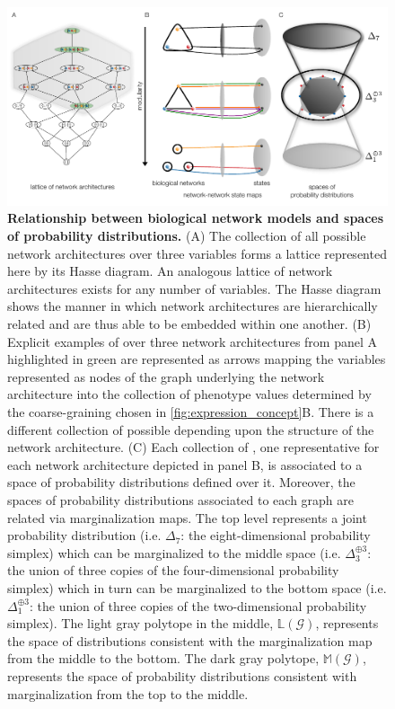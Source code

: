 


\begin{figure}[!ht]
\centering
\noindent\includegraphics[width=0.9\columnwidth]{fig/conediagram.pdf}
\caption{{\bf Relationship between biological network models and spaces of probability distributions.} (A) The collection of all possible network architectures over three variables forms a lattice represented here by its Hasse diagram. An analogous lattice of network architectures exists for any number of variables. The Hasse diagram shows the manner in which network architectures are hierarchically related and are thus able to be embedded within one another. (B) Explicit examples of \gnpm{} over three network architectures from panel A highlighted in green are represented as arrows mapping the variables represented as nodes of the graph underlying the network architecture into the collection of phenotype values determined by the coarse-graining chosen in \autoref{fig:expression_concept}B. There is a different collection of possible \gnpm{} depending upon the structure of the network architecture. (C) Each collection of \gnpm{}, one representative for each network architecture depicted in panel B, is associated to a space of probability distributions defined over it. Moreover, the spaces of probability distributions associated to each graph are related via marginalization maps. The top level represents a joint probability distribution (i.e. $\Delta_7$: the eight-dimensional probability simplex) which can be marginalized to the middle space (i.e. $\Delta_3^{\oplus 3}$: the union of three copies of the four-dimensional probability simplex) which in turn can be marginalized to the bottom space (i.e. $\Delta_1^{\oplus 3}$: the union of three copies of the two-dimensional probability simplex). The light gray polytope in the middle, $\mathbb{L}(\mathcal{G})$, represents the space of distributions consistent with the marginalization map from the middle to the bottom. The dark gray polytope, $\mathbb{M}(\mathcal{G})$, represents the space of probability distributions consistent with marginalization from the top to the middle.}

\end{figure}

